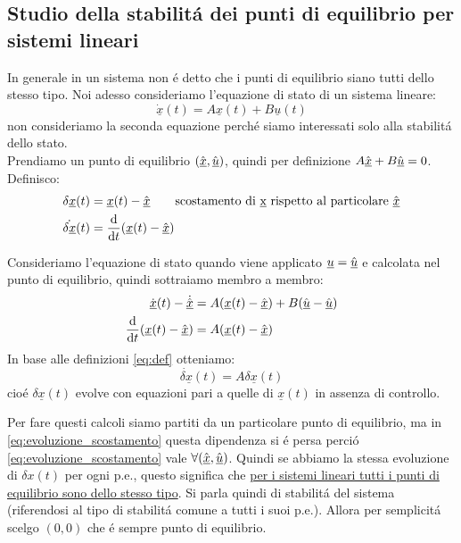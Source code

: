 \documentclass[../main.tex]{subfiles}
\begin{document}
	\subsection{Studio della stabilit\'a dei punti di equilibrio per sistemi lineari}
		In generale in un sistema non \'e detto che i punti di equilibrio siano tutti dello stesso tipo.
		Noi adesso consideriamo l'equazione di stato di un sistema lineare:
		\[ \dot{\underline{x}}(t) = A \underline x(t) + B\underline u(t) \]
		non consideriamo la seconda equazione perch\'e siamo interessati solo alla stabilit\'a dello stato.\\
		Prendiamo un punto di equilibrio $ (\hat{\underline x}, \hat{\underline u}) $, quindi per definizione $ A \hat{\underline x} + B \hat{\underline u} = 0 $. Definisco:
		\begin{align}
			\delta \underline x(t) &= \underline x(t) - \hat{\underline x} \qquad \text{scostamento di \underline x rispetto al particolare}\ \hat{\underline x}\\
			\dot{\delta \underline x}(t) &= \frac{\mathrm{d} }{\mathrm{d} t} (\underline x(t) - \hat{\underline x})
			\label{eq:def}
		\end{align}
		
		Consideriamo l'equazione di stato quando viene applicato $ \underline u = \hat{\underline u} $ e calcolata nel punto di equilibrio, quindi sottraiamo membro a membro:
		\begin{align*}
			\dot{\underline{x}}(t) - \dot{\hat{\underline x}} &= A (\underline x(t) - \hat{\underline x}) + B(\hat{\underline u} - \hat{\underline u})\\
			\frac{\mathrm{d} }{\mathrm{d} t} (\underline x(t) - \hat{\underline x}) &= A (\underline x(t) - \hat{\underline x})
		\end{align*}
		In base alle definizioni \ref{eq:def} otteniamo:
		\begin{equation}
			\dot{\delta \underline x}(t) = A \delta \underline x(t)
			\label{eq:evoluzione_scostamento}
		\end{equation}
		cio\'e $ \delta \underline x(t) $ evolve con equazioni pari a quelle di $ \underline x(t) $ in assenza di controllo.
		
		Per fare questi calcoli siamo partiti da un particolare punto di equilibrio, ma in \ref{eq:evoluzione_scostamento} questa dipendenza si \'e persa perci\'o \ref{eq:evoluzione_scostamento} vale $ \forall (\hat{\underline x}, \hat{\underline u}) $. Quindi se abbiamo la stessa evoluzione di $ \delta x(t) $ per ogni p.e., questo significa che \underline{per i sistemi lineari tutti i punti di equilibrio sono dello stesso tipo}. Si parla quindi di stabilit\'a del sistema (riferendosi al tipo di stabilit\'a comune a tutti i suoi p.e.). Allora per semplicit\'a scelgo $ (0,0) $ che \'e sempre punto di equilibrio. 
		
\end{document}
